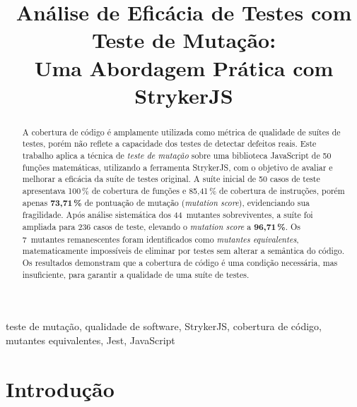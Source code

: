 \documentclass[conference]{IEEEtran}
\begin{document}
\title{Análise de Eficácia de Testes com Teste de Mutação:\\
       Uma Abordagem Prática com StrykerJS}

\author{
}

\maketitle

\begin{abstract}
A cobertura de código é amplamente utilizada como métrica de qualidade de suítes
de testes, porém não reflete a capacidade dos testes de detectar defeitos reais.
Este trabalho aplica a técnica de \textit{teste de mutação} sobre uma biblioteca
JavaScript de 50 funções matemáticas, utilizando a ferramenta StrykerJS, com o
objetivo de avaliar e melhorar a eficácia da suíte de testes original.
A suíte inicial de 50 casos de teste apresentava 100\,\% de cobertura de funções
e 85{,}41\,\% de cobertura de instruções, porém apenas \textbf{73{,}71\,\%} de
pontuação de mutação (\textit{mutation score}), evidenciando sua fragilidade.
Após análise sistemática dos 44~mutantes sobreviventes, a suíte foi ampliada para
236 casos de teste, elevando o \textit{mutation score} a \textbf{96{,}71\,\%}.
Os 7~mutantes remanescentes foram identificados como \textit{mutantes equivalentes},
matematicamente impossíveis de eliminar por testes sem alterar a semântica do
código. Os resultados demonstram que a cobertura de código é uma condição
necessária, mas insuficiente, para garantir a qualidade de uma suíte de testes.
\end{abstract}

\begin{IEEEkeywords}
teste de mutação, qualidade de software, StrykerJS, cobertura de código,
mutantes equivalentes, Jest, JavaScript
\end{IEEEkeywords}

\section{Introdução}
\end{document}
